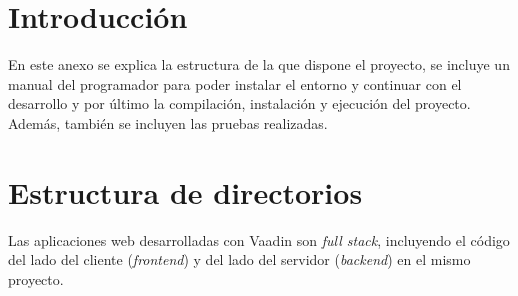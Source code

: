 
\section{Introducción}
En este anexo se explica la estructura de la que dispone el proyecto, se incluye un manual del programador para poder instalar el entorno y continuar con el desarrollo y por último la compilación, instalación y ejecución del proyecto. Además, también se incluyen las pruebas realizadas.

\section{Estructura de directorios}
Las aplicaciones web desarrolladas con Vaadin son \textit{full stack}, incluyendo el código del lado del cliente (\textit{frontend}) y del lado del servidor (\textit{backend}) en el mismo proyecto.

